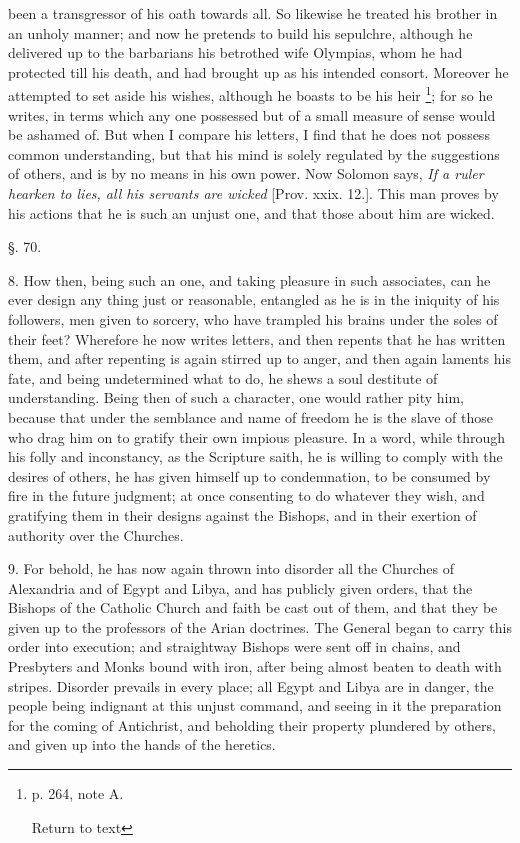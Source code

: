 been a transgressor of his oath towards all. So likewise he treated
his brother in an unholy manner; and now he pretends to build his
sepulchre, although he delivered up to the barbarians his betrothed
wife Olympias, whom he had protected till his death, and had brought
up as his intended consort. Moreover he attempted to set aside his
wishes, although he boasts to be his heir \footnote{p. 264, note A.

Return to text}; for so he writes,
in terms which any one possessed but of a small measure of sense would
be ashamed of. But when I compare his letters, I find that he does not
possess common understanding, but that his mind is solely regulated by
the suggestions of others, and is by no means in his own power. Now
Solomon says, \emph{If a ruler hearken to lies, all his servants are
wicked} [Prov. xxix. 12.]. This man proves by his actions that he
is such an unjust one, and that those about him are wicked.

§. 70.

8. How then, being such an one, and taking
pleasure in such associates, can he ever design any thing just or
reasonable, entangled as he is in the iniquity of his followers, men
given to sorcery, who have trampled his brains under the soles
of their feet? Wherefore he now writes letters, and then repents that
he has written them, and after repenting is again stirred up to anger,
and then again laments his fate, and being undetermined what to do, he
shews a soul destitute of understanding. Being then of such a
character, one would rather pity him, because that under the semblance
and name of freedom he is the slave of those who drag him on to
gratify their own impious pleasure. In a word, while through his folly
and inconstancy, as the Scripture saith, he is willing to comply with
the desires of others, he has given himself up to condemnation, to be
consumed by fire in the future judgment; at once consenting to do
whatever they wish, and gratifying them in their designs against the
Bishops, and in their exertion of authority over the Churches.

9. For behold, he has now again thrown into
disorder all the Churches of Alexandria and of Egypt and Libya, and
has publicly given orders, that the Bishops of the Catholic Church and
faith be cast out of them, and that they be given up to the professors
of the Arian doctrines. The General began to carry this order into
execution; and straightway Bishops were sent off in chains, and
Presbyters and Monks bound with iron, after being almost beaten to
death with stripes. Disorder prevails in every place; all Egypt and
Libya are in danger, the people being indignant at this unjust
command, and seeing in it the preparation for the coming of
Antichrist, and beholding their property plundered by others, and
given up into the hands of the heretics.

